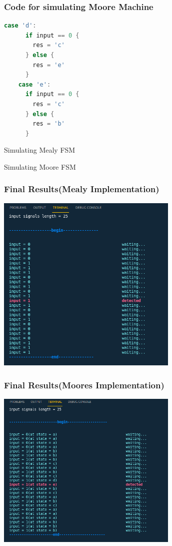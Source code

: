 \documentclass[xcolor=table]{beamer}
\begin{document}
\begin{frame}[fragile]
  \frametitle{Code for simulating Moore Machine}
\begin{lstlisting}[language=go,keywordstyle=\bf,stringstyle=\it]
    case 'd':
      if input == 0 {
        res = 'c'
      } else {
        res = 'e'
      }
    case 'e':
      if input == 0 {
        res = 'c'
      } else {
        res = 'b'
      }
  \end{lstlisting}
\end{frame}

\begin{frame}{Simulating Mealy FSM}
\end{frame}

\begin{frame}{Simulating Moore FSM}
\end{frame}

\begin{frame}
  \frametitle{Final Results(Mealy Implementation)}
  \centering
  \includegraphics[width=0.65\textwidth, height=0.85\textheight]{./static/res_mealy_sim.png}
\end{frame}

\begin{frame}
  \frametitle{Final Results(Moores Implementation)}
  \centering
  \includegraphics[width=0.65\textwidth, height=0.85\textheight]{./static/sim_res_moore.png}
\end{frame}
\end{document}
